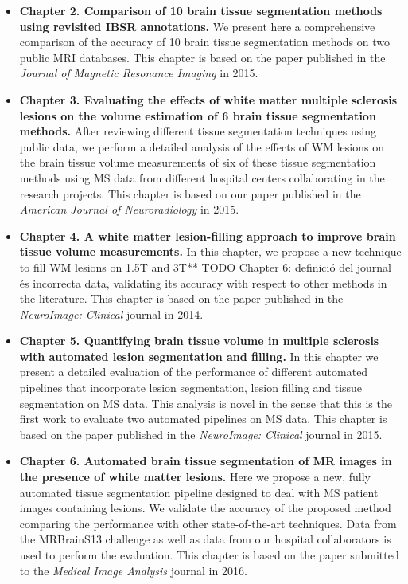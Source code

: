\begin{itemize}
\item \textbf{Chapter 2. Comparison of 10 brain tissue segmentation methods using revisited IBSR annotations.}  We present here a comprehensive comparison of the accuracy of 10 brain tissue segmentation methods on two public MRI databases. This chapter is based on the paper published in  the\textit{ Journal of Magnetic Resonance Imaging} in 2015. 

\item \textbf{Chapter 3. Evaluating the effects of white matter multiple sclerosis lesions on the volume estimation of 6 brain tissue segmentation methods.} After reviewing different tissue segmentation techniques using public data, we perform a detailed analysis of the effects of WM lesions on the brain tissue volume measurements of six of these tissue segmentation methods using MS data from different hospital centers collaborating in the research projects. This chapter is based on our paper published in  the \textit{American Journal of Neuroradiology} in 2015. 

\item \textbf{Chapter 4. A white matter lesion-filling approach to improve brain tissue volume measurements.} In this chapter, we propose a new technique to fill WM lesions on 1.5T and 3T** TODO Chapter 6: definició del journal és incorrecta
 data, validating its accuracy with respect to other methods in the literature. This chapter is based on the paper published in the \textit{NeuroImage: Clinical} journal in 2014. 

\item \textbf{Chapter 5. Quantifying brain tissue volume in multiple sclerosis with automated lesion segmentation and filling.} In this chapter we present a detailed  evaluation of the performance of different automated pipelines that incorporate lesion segmentation, lesion filling and tissue segmentation on MS data. This analysis is novel in the sense that this is the first work to evaluate two automated pipelines on MS data. This chapter is based on the paper published in the \textit{NeuroImage: Clinical} journal in 2015.

\item \textbf{Chapter 6. Automated brain tissue segmentation of MR images in the presence of white matter lesions.} Here we propose a new, fully automated tissue segmentation pipeline designed to deal with MS patient images containing lesions. We validate the accuracy of the proposed method comparing the performance with other state-of-the-art techniques. Data from the MRBrainS13 challenge as well as data from our hospital collaborators is used to perform the evaluation. This chapter is based on the paper submitted to the \textit{Medical Image Analysis} journal in 2016.  


\end{itemize}

